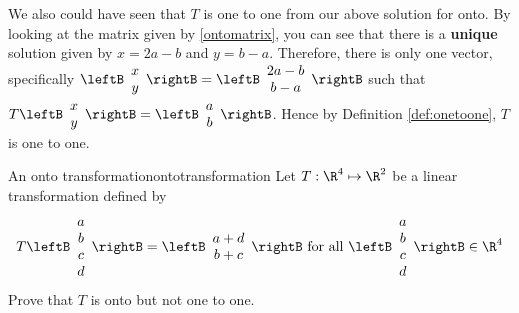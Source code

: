 \begin{solution}
We also could have seen that $T$ is one to one from our above solution for onto. By looking at the matrix given 
by \ref{ontomatrix}, you can see that there is a \textbf{unique} solution given
by $x=2a-b$ and $y=b-a$. Therefore, there
is only one vector, specifically 
$\leftB
\begin{array}{c}
x \\
y
\end{array}
\rightB
=
\leftB
\begin{array}{c}
2a-b\\
b-a
\end{array}
\rightB $ such that $T\leftB
\begin{array}{c}
x \\
y
\end{array}
\rightB =\leftB
\begin{array}{c}
a \\
b
\end{array}
\rightB $. Hence by Definition \ref{def:onetoone}, $T$ is one to one.
\end{solution}

\begin{example}{An onto transformation}{ontotransformation}
Let $T: \R^4 \mapsto \R^2$ be a linear transformation defined by
\[
T \leftB \begin{array}{c}
a \\
b \\
c \\
d
\end{array}
\rightB = 
\leftB \begin{array}{c}
a + d \\
b + c 
\end{array}
\rightB
\mbox{ for all } \leftB \begin{array}{c}
a \\
b \\
c \\
d
\end{array}
\rightB \in \R^4
\]
Prove that $T$ is onto but not one to one.
\end{example}

